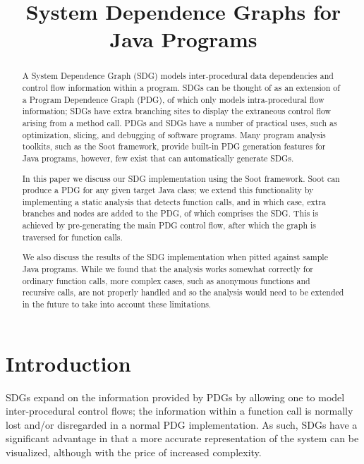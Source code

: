 \documentclass[authoryear,preprint]{sigplanconf}
\begin{document}
\setlength{\pdfpageheight}{\paperheight}
\setlength{\pdfpagewidth}{\paperwidth}


\title{System Dependence Graphs for Java Programs}


\maketitle

\begin{abstract}
A System Dependence Graph (SDG) models inter-procedural data dependencies and control flow information within a program. SDGs can be thought of as an extension of a Program Dependence Graph (PDG), of which only models intra-procedural flow information; SDGs have extra branching sites to display the extraneous control flow arising from a method call. PDGs and SDGs have a number of practical uses, such as optimization, slicing, and debugging of software programs. Many program analysis toolkits, such as the Soot framework, provide built-in PDG generation features for Java programs, however, few exist that can automatically generate SDGs.    

In this paper we discuss our SDG implementation using the Soot framework. Soot can produce a PDG for any given target Java class; we extend this functionality by implementing a static analysis that detects function calls, and in which case, extra branches and nodes are added to the PDG, of which comprises the SDG. This is achieved by pre-generating the main PDG control flow, after which the graph is traversed for function calls.

We also discuss the results of the SDG implementation when pitted against sample Java programs. While we found that the analysis works somewhat correctly for ordinary function calls, more complex cases, such as anonymous functions and recursive calls, are not properly handled and so the analysis would need to be extended in the future to take into account these limitations.  
\end{abstract}


\section{Introduction}
\label{sec:introduction}

SDGs expand on the information provided by PDGs by allowing one to model inter-procedural control flows; the information within a function call is normally lost and/or disregarded in a normal PDG implementation. As such, SDGs have a significant advantage in that a more accurate representation of the system can be visualized, although with the price of increased complexity. 
\end{document}
